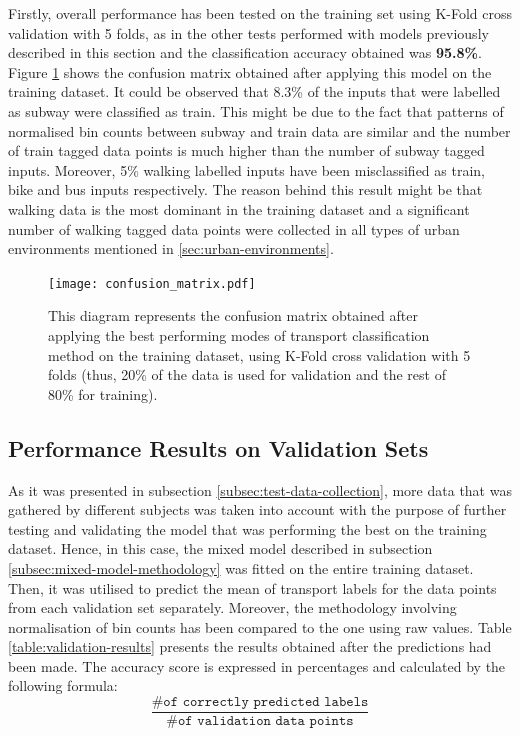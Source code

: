\documentclass[bsc,frontabs,twoside,singlespacing, parskip,deptreport]{infthesis}     %
\begin{document}
Firstly, overall performance has been tested on the training set using K-Fold cross validation with 5 folds, as in the other tests performed with models previously described in this section and the classification accuracy obtained was \textbf{95.8\%}. Figure \ref{fig:confusion_matrix} shows the confusion matrix obtained after applying this model on the training dataset. It could be observed that 8.3\% of the inputs that were labelled as subway were classified as train. This might be due to the fact that patterns of normalised bin counts between subway and train data are similar and the number of train tagged data points is much higher than the number of subway tagged inputs. Moreover, 5\% walking labelled inputs have been misclassified as train, bike and bus inputs respectively. The reason behind this result might be that walking data is the most dominant in the training dataset and a significant number of walking tagged data points were collected in all types of urban environments mentioned in \ref{sec:urban-environments}.

\begin{figure}[h!]
  \center
  \texttt{[image: confusion\_matrix.pdf]}
  \caption{This diagram represents the confusion matrix obtained after applying the best performing modes of transport classification method on the training dataset, using K-Fold cross validation with 5 folds (thus, 20\% of the data is used for validation and the rest of 80\% for training).}
  \label{fig:confusion_matrix}
\end{figure}


\subsection{Performance Results on Validation Sets}

As it was presented in subsection \ref{subsec:test-data-collection}, more data that was gathered by different subjects was taken into account with the purpose of further testing and validating the model that was performing the best on the training dataset. Hence, in this case, the mixed model described in subsection \ref{subsec:mixed-model-methodology} was fitted on the entire training dataset. Then, it was utilised to predict the mean of transport labels for the data points from each validation set separately. Moreover, the methodology involving normalisation of bin counts has been compared to the one using raw values. Table \ref{table:validation-results} presents the results obtained after the predictions had been made. The accuracy score is expressed in percentages and calculated by the following formula: $$ \frac{\texttt{\# of correctly predicted labels}}{\texttt{\# of validation data points}} $$
\end{document}
